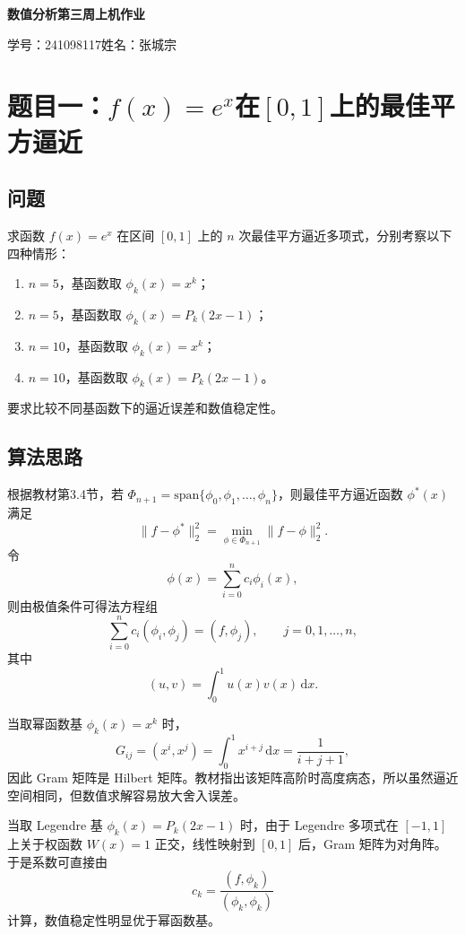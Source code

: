 \documentclass[UTF8,a4paper,11pt]{article}
\begin{document}
\begin{center}
{\huge \textbf{数值分析第三周上机作业}}

\vspace{0.3cm}
{\large 学号：241098117\quad 姓名：张城宗\quad}
\end{center}

\section[题目一]{题目一：\texorpdfstring{$f(x)=e^x$}{f(x)=e\^x}在\texorpdfstring{$[0,1]$}{[0,1]}上的最佳平方逼近}

\subsection{问题}

求函数 $f(x)=e^x$ 在区间 $[0,1]$ 上的 $n$ 次最佳平方逼近多项式，分别考察以下四种情形：
\begin{enumerate}
  \item $n=5$，基函数取 $\phi_k(x)=x^k$；
  \item $n=5$，基函数取 $\phi_k(x)=P_k(2x-1)$；
  \item $n=10$，基函数取 $\phi_k(x)=x^k$；
  \item $n=10$，基函数取 $\phi_k(x)=P_k(2x-1)$。
\end{enumerate}
要求比较不同基函数下的逼近误差和数值稳定性。

\subsection{算法思路}

根据教材第3.4节，若 $\Phi_{n+1}=\mathrm{span}\{\phi_0,\phi_1,\dots,\phi_n\}$，则最佳平方逼近函数 $\phi^\ast(x)$ 满足
\[
\|f-\phi^\ast\|_2^2=\min_{\phi\in\Phi_{n+1}}\|f-\phi\|_2^2.
\]
令
\[
\phi(x)=\sum_{i=0}^{n} c_i\phi_i(x),
\]
则由极值条件可得法方程组
\[
\sum_{i=0}^{n} c_i(\phi_i,\phi_j)=(f,\phi_j),\qquad j=0,1,\dots,n,
\]
其中
\[
(u,v)=\int_0^1 u(x)v(x)\,\mathrm{d}x.
\]

当取幂函数基 $\phi_k(x)=x^k$ 时，
\[
G_{ij}=(x^i,x^j)=\int_0^1 x^{i+j}\,\mathrm{d}x=\frac{1}{i+j+1},
\]
因此 Gram 矩阵是 Hilbert 矩阵。教材指出该矩阵高阶时高度病态，所以虽然逼近空间相同，但数值求解容易放大舍入误差。

当取 Legendre 基 $\phi_k(x)=P_k(2x-1)$ 时，由于 Legendre 多项式在 $[-1,1]$ 上关于权函数 $W(x)=1$ 正交，线性映射到 $[0,1]$ 后，Gram 矩阵为对角阵。于是系数可直接由
\[
c_k=\frac{(f,\phi_k)}{(\phi_k,\phi_k)}
\]
计算，数值稳定性明显优于幂函数基。
\end{document}
